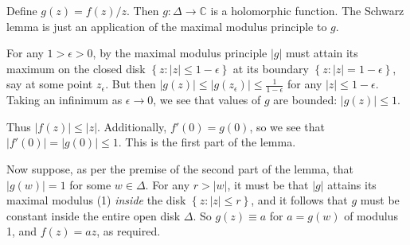 \documentclass[12pt]{article}
\newcommand{\Complex}{\mathbb{C}}
\newcommand{\size}[1]{\left|#1\right|}
\begin{document}
Define $g(z)=f(z)/z$.  Then $g:\Delta\to\Complex$ is a holomorphic function.  The Schwarz lemma is just an application of the maximal modulus principle to $g$.

For any $1>\epsilon>0$, by the maximal modulus principle $\size{g}$ must attain its maximum on the closed disk $\left\{z:\size{z}\le 1-\epsilon\right\}$ at its boundary $\left\{z:\size{z}=1-\epsilon\right\}$, say at some point $z_{\epsilon}$. But then $\size{g(z)}\le \size{g(z_{\epsilon})} \le \frac{1}{1-\epsilon}$ for any $\size{z}\le 1-\epsilon$.  Taking an infinimum as $\epsilon\to0$, we see that values of $g$ are bounded: $\size{g(z)}\le 1$.

Thus $\size{f(z)}\le\size{z}$.  Additionally, $f'(0)=g(0)$, so we see that $\size{f'(0)}=\size{g(0)}\le 1$.  This is the first part of the lemma.

Now suppose, as per the premise of the second part of the lemma, that $|g(w)|=1$ for some $w\in\Delta$.  For any $r>\size{w}$, it must be that $\size{g}$ attains its maximal modulus (1) \emph{inside} the disk $\left\{z:\size{z}\le r\right\}$, and it follows that $g$ must be constant inside the entire open disk $\Delta$.  So $g(z)\equiv a$ for $a=g(w)$ of modulus 1, and $f(z)=az$, as required.
\end{document}
